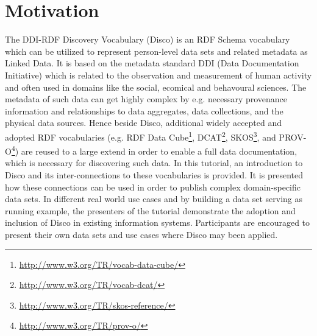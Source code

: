 \documentclass{llncs}
\begin{document}
%

\section{Motivation}
The DDI-RDF Discovery Vocabulary (Disco) \cite{Bosch2012} is an RDF Schema vocabulary which can be utilized to represent person-level data sets and related metadata as Linked Data. 
It is based on the metadata standard DDI (Data Documentation Initiative) which is related to the observation and measurement of human activity and often used in domains like the social, ecomical and behavoural sciences. 
The metadata of such data can get highly complex by e.g. necessary provenance information and relationships to data aggregates, data collections, and the physical data sources.
Hence beside Disco, additional widely accepted and adopted RDF vocabularies (e.g. RDF Data Cube\footnote{\url{http://www.w3.org/TR/vocab-data-cube/}}, DCAT\footnote{\url{http://www.w3.org/TR/vocab-dcat/}}, SKOS\footnote{\url{http://www.w3.org/TR/skos-reference/}}, and PROV-O\footnote{\url{http://www.w3.org/TR/prov-o/}}) are reused to a large extend \cite{Bosch2013} in order to enable a full data documentation, which is necessary for discovering such data. 
In this tutorial, an introduction to Disco and its inter-connections to these vocabularies is provided. 
It is presented how these connections can be used in order to publish complex domain-specific data sets.
In different real world use cases and by building a data set serving as running example, the presenters of the tutorial demonstrate the adoption and inclusion of Disco in existing information systems.
Participants are encouraged to present their own data sets and use cases where Disco may been applied. 
\end{document}
